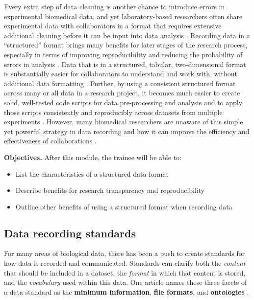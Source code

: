 \documentclass[]{tufte-book}
\providecommand{\tightlist}{%
  \setlength{\itemsep}{0pt}\setlength{\parskip}{0pt}}
\begin{document}
Every extra step of data cleaning is another chance to introduce errors in
experimental biomedical data, and yet laboratory-based researchers often share
experimental data with collaborators in a format that requires extensive
additional cleaning before it can be input into data analysis
\citep{broman2018data}. Recording data in a ``structured'' format brings many
benefits for later stages of the research process, especially in terms of
improving reproducibility and reducing the probability of errors in analysis
\citep{ellis2018share}. Data that is in a structured, tabular, two-dimensional
format is substantially easier for collaborators to understand and work with,
without additional data formatting \citep{broman2018data}. Further, by using a
consistent structured format across many or all data in a research project, it
becomes much easier to create solid, well-tested code scripts for data
pre-processing and analysis and to apply those scripts consistently and
reproducibly across datasets from multiple experiments \citep{broman2018data}.
However, many biomedical researchers are unaware of this simple yet powerful
strategy in data recording and how it can improve the efficiency and
effectiveness of collaborations \citep{ellis2018share}.

\textbf{Objectives.} After this module, the trainee will be able to:

\begin{itemize}
\tightlist
\item
  List the characteristics of a structured data format
\item
  Describe benefits for research transparency and reproducibility
\item
  Outline other benefits of using a structured format when recording data
\end{itemize}

\hypertarget{data-recording-standards}{%
\subsection{Data recording standards}\label{data-recording-standards}}

For many areas of biological data, there has been a push to create standards for
how data is recorded and communicated. Standards can clarify both the \emph{content}
that should be included in a dataset, the \emph{format} in which that content is
stored, and the \emph{vocabulary} used within this data. One article names these three
facets of a data standard as the \textbf{minimum information}, \textbf{file formats}, and
\textbf{ontologies} \citep{ghosh2011software}.
\end{document}
